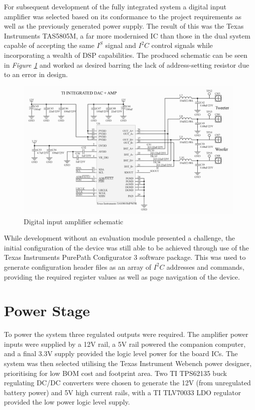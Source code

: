 \documentclass[main.tex]{subfiles}
\begin{document}
For subsequent development of the fully integrated system a digital input amplifier was selected based on its conformance to the project requirements as well as the previously generated power supply. The result of this was the Texas Instruments TAS5805M, a far more modernised IC than those in the dual system capable of accepting the same $I^S$ signal and $I^2C$ control signals while incorporating a wealth of DSP capabilities. The produced schematic can be seen in \textit{Figure \ref{fig:tas-circuit}} and worked as desired barring the lack of address-setting resistor due to an error in design.

\begin{figure}[H]
    \centering
    \includegraphics[scale=0.75]{./figs/TAS-circuit.PNG}
    \caption{Digital input amplifier schematic}
    \label{fig:tas-circuit}
\end{figure}

While development without an evaluation module presented a challenge, the initial configuration of the device was still able to be achieved through use of the Texas Instruments PurePath Configurator 3 software package. This was used to generate configuration header files as an array of $I^2C$ addresses and commands, providing the required register values as well as page navigation of the device.

\section{Power Stage}

To power the system three regulated outputs were required. The amplifier power inputs were supplied by a 12V rail, a 5V rail powered the companion computer, and a final 3.3V supply provided the logic level power for the board ICs. The system was then selected utilising the Texas Instrument Webench power designer, prioritising for low BOM cost and footprint area. Two TI TPS62135 buck regulating DC/DC converters were chosen to generate the 12V (from unregulated battery power) and 5V high current rails, with a TI TLV70033 LDO regulator provided the low power logic level supply. 
\end{document}
